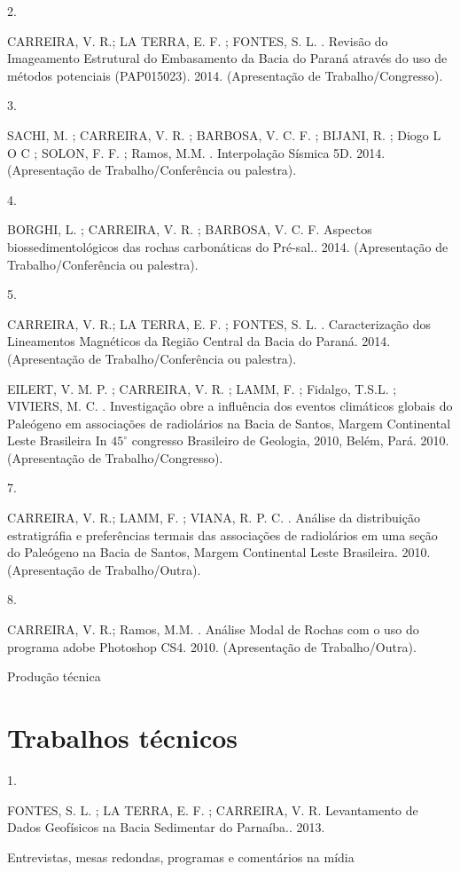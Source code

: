 \documentclass[10pt]{article}
\begin{document}
2.

CARREIRA, V. R.; LA TERRA, E. F. ; FONTES, S. L. . Revisão do Imageamento Estrutural do Embasamento da Bacia do Paraná através do uso de métodos potenciais (PAP015023). 2014. (Apresentação de Trabalho/Congresso).

3.

SACHI, M. ; CARREIRA, V. R. ; BARBOSA, V. C. F. ; BIJANI, R. ; Diogo L O C ; SOLON, F. F. ; Ramos, M.M. . Interpolação Sísmica 5D. 2014. (Apresentação de Trabalho/Conferência ou palestra).

4.

BORGHI, L. ; CARREIRA, V. R. ; BARBOSA, V. C. F. Aspectos biossedimentológicos das rochas carbonáticas do Pré-sal.. 2014. (Apresentação de Trabalho/Conferência ou palestra).

5.

CARREIRA, V. R.; LA TERRA, E. F. ; FONTES, S. L. . Caracterização dos Lineamentos Magnéticos da Região Central da Bacia do Paraná. 2014. (Apresentação de Trabalho/Conferência ou palestra).

EILERT, V. M. P. ; CARREIRA, V. R. ; LAMM, F. ; Fidalgo, T.S.L. ; VIVIERS, M. C. . Investigação obre a influência dos eventos climáticos globais do Paleógeno em associações de radiolários na Bacia de Santos, Margem Continental Leste Brasileira In $45^{\circ}$ congresso Brasileiro de Geologia, 2010, Belém, Pará. 2010. (Apresentação de Trabalho/Congresso).

7.

CARREIRA, V. R.; LAMM, F. ; VIANA, R. P. C. . Análise da distribuição estratigráfia e preferências termais das associações de radiolários em uma seção do Paleógeno na Bacia de Santos, Margem Continental Leste Brasileira. 2010. (Apresentação de Trabalho/Outra).

8.

CARREIRA, V. R.; Ramos, M.M. . Análise Modal de Rochas com o uso do programa adobe Photoshop CS4. 2010. (Apresentação de Trabalho/Outra).

Produção técnica

\section*{Trabalhos técnicos}
1.

FONTES, S. L. ; LA TERRA, E. F. ; CARREIRA, V. R. Levantamento de Dados Geofísicos na Bacia Sedimentar do Parnaíba.. 2013.

Entrevistas, mesas redondas, programas e comentários na mídia
\end{document}
